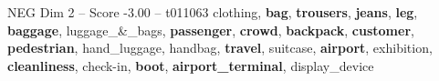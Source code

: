 \begin{textsample}{NEG Dim 2 – Score -3.00 – t011063}  \label{ex:f2_neg_030}
clothing, \textbf{bag}, \textbf{trousers}, \textbf{jeans}, \textbf{leg}, \textbf{baggage}, luggage\_\&\_bags, \textbf{passenger}, \textbf{crowd}, \textbf{backpack}, \textbf{customer}, \textbf{pedestrian}, hand\_luggage, handbag, \textbf{travel}, suitcase, \textbf{airport}, exhibition, \textbf{cleanliness}, check-in, \textbf{boot}, \textbf{airport\_terminal}, display\_device

\end{textsample}
